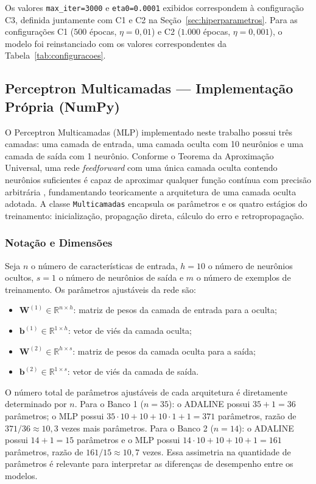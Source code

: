 Os valores \texttt{max\_iter=3000} e \texttt{eta0=0.0001} exibidos correspondem à configuração C3, definida juntamente com C1 e C2 na Seção~\ref{sec:hiperparametros}. Para as configurações C1 ($500$ épocas, $\eta = 0{,}01$) e C2 ($1.000$ épocas, $\eta = 0{,}001$), o modelo foi reinstanciado com os valores correspondentes da Tabela~\ref{tab:configuracoes}.

\subsection{Perceptron Multicamadas --- Implementação Própria (NumPy)}
\label{sec:mlp_numpy}

O Perceptron Multicamadas (MLP) implementado neste trabalho possui três camadas: uma camada de entrada, uma camada oculta com 10 neurônios e uma camada de saída com 1 neurônio. Conforme o Teorema da Aproximação Universal, uma rede \textit{feedforward} com uma única camada oculta contendo neurônios suficientes é capaz de aproximar qualquer função contínua com precisão arbitrária \cite{braga2007}, fundamentando teoricamente a arquitetura de uma camada oculta adotada. A classe \texttt{Multicamadas} encapsula os parâmetros e os quatro estágios do treinamento: inicialização, propagação direta, cálculo do erro e retropropagação.

\subsubsection{Notação e Dimensões}

Seja $n$ o número de características de entrada, $h = 10$ o número de neurônios ocultos, $s = 1$ o número de neurônios de saída e $m$ o número de exemplos de treinamento. Os parâmetros ajustáveis da rede são:

\begin{itemize}
    \item $\mathbf{W}^{(1)} \in \mathbb{R}^{n \times h}$: matriz de pesos da camada de entrada para a oculta;
    \item $\mathbf{b}^{(1)} \in \mathbb{R}^{1 \times h}$: vetor de viés da camada oculta;
    \item $\mathbf{W}^{(2)} \in \mathbb{R}^{h \times s}$: matriz de pesos da camada oculta para a saída;
    \item $\mathbf{b}^{(2)} \in \mathbb{R}^{1 \times s}$: vetor de viés da camada de saída.
\end{itemize}

O número total de parâmetros ajustáveis de cada arquitetura é diretamente determinado por $n$. Para o Banco 1 ($n = 35$): o ADALINE possui $35 + 1 = 36$ parâmetros; o MLP possui $35 \cdot 10 + 10 + 10 \cdot 1 + 1 = 371$ parâmetros, razão de $371/36 \approx 10{,}3$ vezes mais parâmetros. Para o Banco 2 ($n = 14$): o ADALINE possui $14 + 1 = 15$ parâmetros e o MLP possui $14 \cdot 10 + 10 + 10 + 1 = 161$ parâmetros, razão de $161/15 \approx 10{,}7$ vezes. Essa assimetria na quantidade de parâmetros é relevante para interpretar as diferenças de desempenho entre os modelos.

